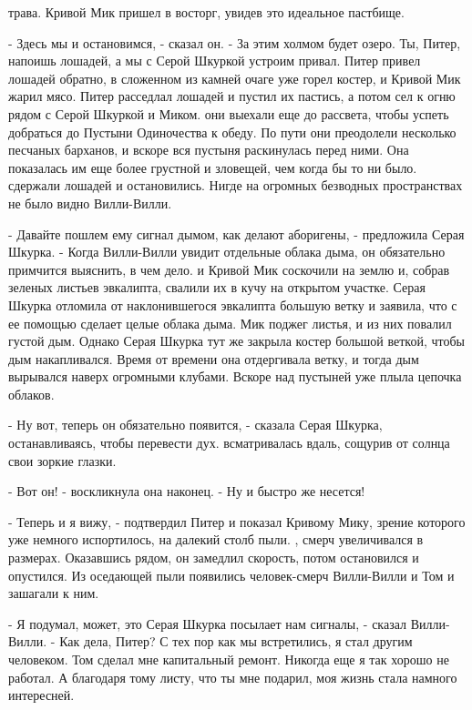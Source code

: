 трава. Кривой Мик пришел в восторг, увидев это идеальное пастбище.
\par- Здесь мы и остановимся, - сказал он. - За этим холмом будет 
озеро. Ты, Питер, напоишь лошадей, а мы с Серой Шкуркой устроим 
привал.
 Питер привел лошадей обратно, в сложенном из камней очаге 
уже горел костер, и Кривой Мик жарил мясо. Питер расседлал лошадей и 
пустил их пастись, а потом сел к огню рядом с Серой Шкуркой и Миком.
 они выехали еще до рассвета, чтобы успеть добраться до 
Пустыни Одиночества к обеду. По пути они преодолели несколько песчаных 
барханов, и вскоре вся пустыня раскинулась перед ними. Она показалась 
им еще более грустной и зловещей, чем когда бы то ни было.
 сдержали лошадей и остановились. Нигде на огромных безводных 
пространствах не было видно Вилли-Вилли.
\par- Давайте пошлем ему сигнал дымом, как делают аборигены, - 
предложила Серая Шкурка. - Когда Вилли-Вилли увидит отдельные облака 
дыма, он обязательно примчится выяснить, в чем дело.
 и Кривой Мик соскочили на землю и, собрав зеленых листьев 
эвкалипта, свалили их в кучу на открытом участке. Серая Шкурка 
отломила от наклонившегося эвкалипта большую ветку и заявила, что с ее 
помощью сделает целые облака дыма.
 Мик поджег листья, и из них повалил густой дым. Однако 
Серая Шкурка тут же закрыла костер большой веткой, чтобы дым 
накапливался. Время от времени она отдергивала ветку, и тогда дым 
вырывался наверх огромными клубами. Вскоре над пустыней уже плыла 
цепочка облаков.
\par- Ну вот, теперь он обязательно появится, - сказала Серая Шкурка, 
останавливаясь, чтобы перевести дух.
 всматривалась вдаль, сощурив от солнца свои зоркие глазки.
\par- Вот он! - воскликнула она наконец. - Ну и быстро же несется!
\par- Теперь и я вижу, - подтвердил Питер и показал Кривому Мику, 
зрение которого уже немного испортилось, на далекий столб пыли.
, смерч увеличивался в размерах. Оказавшись рядом, он 
замедлил скорость, потом остановился и опустился. Из оседающей пыли 
появились человек-смерч Вилли-Вилли и Том и зашагали к ним.
\par- Я подумал, может, это Серая Шкурка посылает нам сигналы, - 
сказал Вилли-Вилли. - Как дела, Питер? С тех пор как мы встретились, я 
стал другим человеком. Том сделал мне капитальный ремонт. Никогда еще 
я так хорошо не работал. А благодаря тому листу, что ты мне подарил, 
моя жизнь стала намного интересней.
